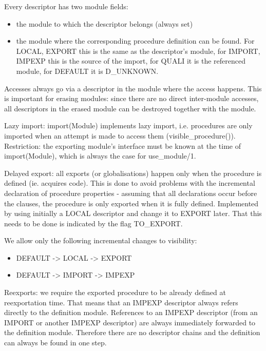 Every descriptor has two module fields:
\begin{itemize}
\item the module to which the descriptor belongs (always set)
\item the module where the corresponding procedure definition
	can be found. For LOCAL, EXPORT this is the same as the descriptor's
	module,
	for IMPORT, IMPEXP this is the source of the import, for QUALI it
	is the referenced module, for DEFAULT it is D_UNKNOWN.
\end{itemize}
Accesses always go via a descriptor in the module where the access
happens.  This is important for erasing modules: since there are no
direct inter-module accesses, all descriptors in the erased module
can be destroyed together with the module.

Lazy import: import(Module) implements lazy import, i.e. procedures are
only imported when an attempt is made to access them (visible_procedure()).
Restriction: the exporting module's interface must be known at the time
of import(Module), which is always the case for use_module/1.

Delayed export:  all exports (or globalisations) happen only when the
procedure is defined (ie. acquires code). This is done to avoid problems
with the incremental declaration of procedure properties - assuming that
all declarations occur before the clauses, the procedure is only
exported when it is fully defined. Implemented by using initially a
LOCAL descriptor and change it to EXPORT later. That this needs
to be done is indicated by the flag TO_EXPORT.

We allow only the following incremental changes to visibility:
\begin{itemize}
\item DEFAULT -> LOCAL -> EXPORT
\item DEFAULT -> IMPORT -> IMPEXP
\end{itemize}

Reexports:  we require the exported procedure to be already defined at
reexportation time.  That means that an IMPEXP descriptor always refers
directly to the definition module.  References to an IMPEXP descriptor
(from an IMPORT or another IMPEXP descriptor) are always immediately
forwarded to the definition module.  Therefore there are no descriptor
chains and the definition can always be found in one step. 
 


